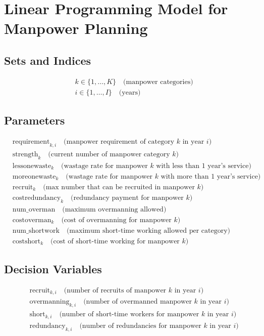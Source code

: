 \documentclass{article}
\begin{document}
\section*{Linear Programming Model for Manpower Planning}

\subsection*{Sets and Indices}
\begin{align*}
    &k \in \{1, \ldots, K\} \quad \text{(manpower categories)} \\
    &i \in \{1, \ldots, I\} \quad \text{(years)}
\end{align*}

\subsection*{Parameters}
\begin{align*}
    &\text{requirement}_{k, i} \quad \text{(manpower requirement of category $k$ in year $i$)}\\
    &\text{strength}_k \quad \text{(current number of manpower category $k$)} \\
    &\text{lessonewaste}_k \quad \text{(wastage rate for manpower $k$ with less than 1 year's service)}\\
    &\text{moreonewaste}_k \quad \text{(wastage rate for manpower $k$ with more than 1 year's service)}\\
    &\text{recruit}_k \quad \text{(max number that can be recruited in manpower $k$)}\\
    &\text{costredundancy}_k \quad \text{(redundancy payment for manpower $k$)}\\
    &\text{num\_overman} \quad \text{(maximum overmanning allowed)} \\
    &\text{costoverman}_k \quad \text{(cost of overmanning for manpower $k$)}\\
    &\text{num\_shortwork} \quad \text{(maximum short-time working allowed per category)}\\
    &\text{costshort}_k \quad \text{(cost of short-time working for manpower $k$)}
\end{align*}

\subsection*{Decision Variables}
\begin{align*}
    &\text{recruit}_{k, i} \quad \text{(number of recruits of manpower $k$ in year $i$)}\\
    &\text{overmanning}_{k, i} \quad \text{(number of overmanned manpower $k$ in year $i$)}\\
    &\text{short}_{k, i} \quad \text{(number of short-time workers for manpower $k$ in year $i$)}\\
    &\text{redundancy}_{k, i} \quad \text{(number of redundancies for manpower $k$ in year $i$)}
\end{align*}
\end{document}
